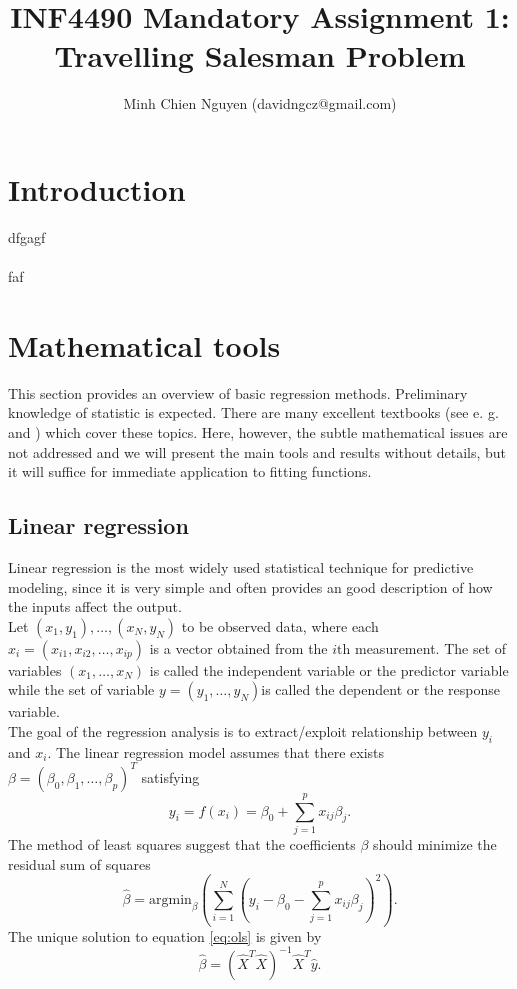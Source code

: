 \documentclass [11pt]{article}
\title{INF4490 Mandatory Assignment 1: \\ Travelling Salesman Problem}
\author{Minh Chien Nguyen (davidngcz@gmail.com)}
\begin{document}
\maketitle
\nocite{*}

\section{Introduction}
dfgagf\\
\\
faf
\section{Mathematical tools}
\label{sec:techniques}
This section provides an overview of basic regression methods. Preliminary knowledge of statistic is expected. There are many excellent textbooks (see e. g. \cite{abc} and \cite{abc}) which cover these topics. Here, however, the subtle mathematical issues are not addressed and we will present the main tools and results without details, but it will suffice for immediate application to fitting functions.\\

\subsection{Linear regression}
Linear regression is the most widely used statistical technique for predictive modeling, since it is very simple and often provides an good description of how the inputs affect the output.\\
Let $(x_{1},y_{1}),\ldots,(x_{N},y_{N})$ to be observed data, where each $x_{i} = (x_{i1},x_{i2},\ldots,x_{i p})$ is a vector obtained from the $i\text{th}$ measurement. The set of variables $(x_{1},\ldots,x_{N})$ is called the independent variable or the predictor variable while the set of variable $y=(y_{1},\ldots,y_{N})$is called the dependent or the response variable. \\
The goal of the regression analysis is to extract/exploit relationship between $y_i$ and $x_i$. The linear regression model assumes that there exists $\beta=(\beta_{0},\beta_{1},\ldots,\beta_{p})^{T}$ satisfying 
\begin{equation}
y_{i}=f(x_{i})=\beta_{0} + \sum_{j=1}^{p}x_{ij}\beta_{j}.
\end{equation}
The method of least squares suggest that the coefficients $\beta$ should minimize the residual sum of squares
\begin{equation}
\hat{\beta}=\text{argmin}_{\beta} ( \sum_{i=1}^{N}(y_{i}- \beta_{0}- \sum_{j=1}^{p}x_{ij}\beta_{j})^{2}).
\label{eq:ols}
\end{equation}
The unique solution to equation \eqref{eq:ols} is given by \cite{def}
\begin{equation}
\hat{\beta} =\left(\hat{X}^T\hat{X}\right)^{-1}\hat{X}^T\hat{y}.
\end{equation}
\end{document}
